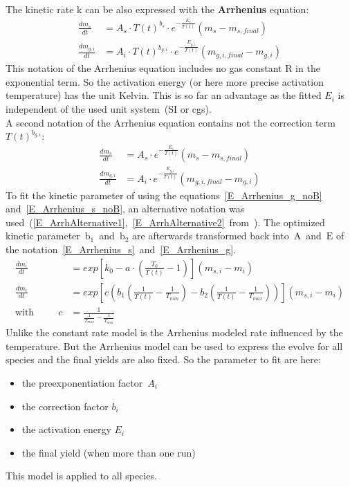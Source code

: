 The kinetic rate k can be also expressed with the \textbf{Arrhenius} equation:
\begin{align}\label{E_Arrhenius_s}
 \frac{dm_s}{dt}&=A_s \cdot T(t)^{b_s} \cdot e^{-\frac{E_s}{T(t)}}\left( m_{s} - m_{s,final} \right)\\
\label{E_Arrhenius_g}
 \frac{dm_{g,i}}{dt}&=A_i \cdot T(t)^{b_{g,i}} \cdot e^{-\frac{E_{g,i}}{T(t)}}\left(m_{g,i,final} - m_{g,i}\right)
\end{align}
This notation of the Arrhenius equation includes no gas constant R in the exponential term. So the activation energy (or here more precise activation temperature) has the unit Kelvin. This is so far an advantage as the fitted $E_i$ is independent of the used unit system~(SI or cgs).\\
A second notation of the Arrhenius equation contains not the correction term $T(t)^{b_{g,i}}$:
\begin{align}\label{E_Arrhenius_s_noB}
 \frac{dm_s}{dt}&=A_s \cdot e^{-\frac{E_s}{T(t)}}\left( m_{s} - m_{s,final} \right)\\
\label{E_Arrhenius_g_noB}
 \frac{dm_{g,i}}{dt}&=A_i \cdot e^{-\frac{E_{g,i}}{T(t)}}\left(m_{g,i,final} - m_{g,i}\right)
\end{align}
To fit the kinetic parameter of using the equations~\ref{E_Arrhenius_g_noB} and~\ref{E_Arrhenius_s_noB}, an alternative notation was used~(\ref{E_ArrhAlternative1},~\ref{E_ArrhAlternative2}~from~\cite{Ferraris_1,Ferraris_2}). The optimized kinetic parameter~$\mathrm{b_1}$~and~$\mathrm{b_2}$ are afterwards transformed back into~$\mathrm{A}$~and~$\mathrm{E}$ of the notation~\ref{E_Arrhenius_s}~and~\ref{E_Arrhenius_g}.
\begin{align}
\label{E_ArrhAlternative1}
 \frac{dm_i}{dt} &= exp \left[ k_0  - a \cdot \left( \frac{T_0}{T(t)}-1 \right)  \right]\left(m_{s,i} - m_i \right)\\
\label{E_ArrhAlternative2}
 \frac{dm_i}{dt} &= exp \left[ c \left(b_1 \left(\frac{1}{T(t)} - \frac{1}{T_{min}}\right) - b_2 \left(\frac{1}{T(t)} - \frac{1}{T_{max}}\right)\right) \right]\left(m_{s,i} - m_i \right)\\
\mathrm{with}\;\;\;\;\;\;\;\;\; c&=\frac{1}{\frac{1}{T_{max}}-\frac{1}{T_{min}}}
\end{align}
Unlike the constant rate model is the Arrhenius modeled rate influenced by the temperature. But the Arrhenius model can be used to express the evolve for all species and the final yields are also fixed. So the parameter to fit are here:
\begin{itemize}
 \item the preexponentiation factor~$A_i$
 \item the correction factor $b_i$
 \item the activation energy $E_i$
 \item the final yield (when more than one run)
\end{itemize}
This model is applied to all species.\\

